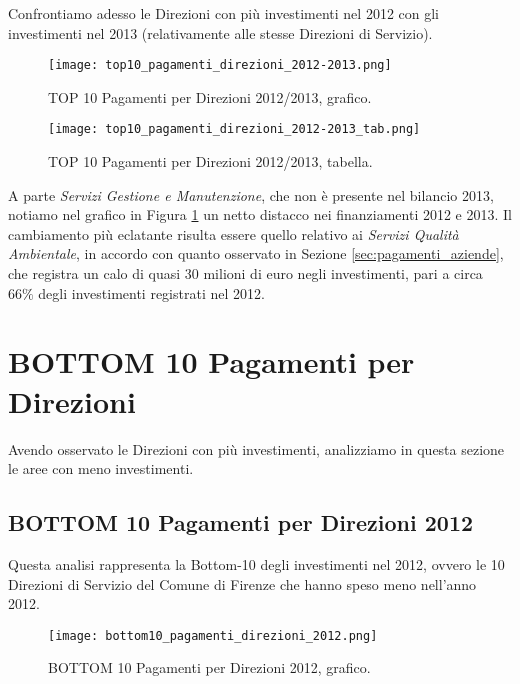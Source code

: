 			Confrontiamo adesso le Direzioni con più investimenti nel 2012 con gli investimenti nel 2013 (relativamente alle stesse Direzioni di Servizio).
	
			\begin{figure}[h!]
				\centering
					\texttt{[image: top10\_pagamenti\_direzioni\_2012-2013.png]}
				\caption{TOP 10 Pagamenti per Direzioni 2012/2013, grafico.}
				\label{fig:top10_pagamenti_direzioni_2012-2013}
			\end{figure}
			
			\begin{figure}[h!]
				\centering
					\texttt{[image: top10\_pagamenti\_direzioni\_2012-2013\_tab.png]}
				\caption{TOP 10 Pagamenti per Direzioni 2012/2013, tabella.}
				\label{fig:top10_pagamenti_direzioni_2012-2013_tab}
			\end{figure}
			
			A parte \textit{Servizi Gestione e Manutenzione}, che non è presente nel bilancio 2013, notiamo nel grafico in Figura \ref{fig:top10_pagamenti_direzioni_2012-2013} un netto distacco nei finanziamenti 2012 e 2013. Il cambiamento più eclatante risulta essere quello relativo ai \textit{Servizi Qualità Ambientale}, in accordo con quanto osservato in Sezione \ref{sec:pagamenti_aziende}, che registra un calo di quasi 30 milioni di euro negli investimenti, pari a circa $66\%$ degli investimenti registrati nel 2012.
			
			\FloatBarrier
	
	\section{BOTTOM 10 Pagamenti per Direzioni} \label{sec:bottom_pagamenti_direzioni}
	
		Avendo osservato le Direzioni con più investimenti, analizziamo in questa sezione le aree con meno investimenti.
	
		\subsection{BOTTOM 10 Pagamenti per Direzioni 2012} \label{subsec:bottom_pagamenti_direzioni_2012}
		
			Questa analisi rappresenta la Bottom-10 degli investimenti nel 2012, ovvero le 10 Direzioni di Servizio del Comune di Firenze che hanno speso meno nell'anno 2012.
		
			\begin{figure}[h!]
				\centering
					\texttt{[image: bottom10\_pagamenti\_direzioni\_2012.png]}
				\caption{BOTTOM 10 Pagamenti per Direzioni 2012, grafico.}
				\label{fig:bottom10_pagamenti_direzioni_2012}
			\end{figure}
			
